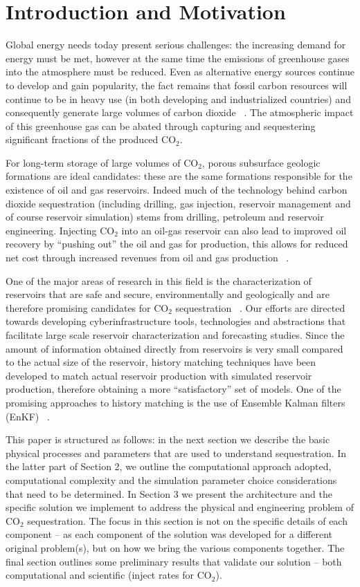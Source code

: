\documentclass{acm_proc_article-sp}
\begin{document}
\section{Introduction and Motivation}

Global energy needs today present serious challenges: the increasing
demand for energy must be met, however at the same time the emissions
of greenhouse gases into the atmosphere must be reduced. Even as
alternative energy sources continue to develop and gain popularity,
the fact remains that fossil carbon resources will continue to be in
heavy use (in both developing and industrialized countries) and
consequently generate large volumes of carbon dioxide
~\cite{GeoRPT}. The atmospheric impact of this greenhouse gas can be
abated through capturing and sequestering significant fractions of the
produced CO$_2$.

For long-term storage of large volumes of CO$_2$, porous subsurface
geologic formations are ideal candidates: these are the same
formations responsible for the existence of oil and gas
reservoirs. Indeed much of the technology behind carbon dioxide
sequestration (including drilling, gas injection, reservoir management
and of course reservoir simulation) stems from drilling, petroleum and
reservoir engineering. Injecting CO$_2$ into an oil-gas reservoir can
also lead to improved oil recovery by ``pushing out'' the oil and gas
for production, this allows for reduced net cost through increased
revenues from oil and gas production ~\cite{EORBook}.

One of the major areas of research in this field is the
characterization of reservoirs that are safe and secure,
environmentally and geologically and are therefore promising
candidates for CO$_2$ sequestration ~\cite{GeoRPT,Luigi}. Our efforts
are directed towards developing cyberinfrastructure tools,
technologies and abstractions that facilitate large scale reservoir
characterization and forecasting studies.  Since the amount of
information obtained directly from reservoirs is very small compared
to the actual size of the reservoir, history matching techniques have
been developed to match actual reservoir production with simulated
reservoir production, therefore obtaining a more ``satisfactory'' set
of models. One of the promising approaches to history matching is the
use of Ensemble Kalman filters (EnKF) ~\cite{KalmanPaper, DO2007,
  LiEnKF07, DO2006}. 

This paper is structured as follows: in the next section we describe the basic
physical processes and parameters that are used to understand
sequestration. In the latter part of Section 2, we outline the
computational approach adopted, computational complexity and the
simulation parameter choice considerations that need to be determined.
In Section 3 we present the architecture and the specific solution we
implement to address the physical and engineering problem of CO$_2$
sequestration. The focus in this section is not on the specific
details of each component -- as each component of the solution was
developed for a different original problem(s), but on how we bring the
various components together.  The final section outlines some
preliminary results that validate our solution -- both computational
and scientific (inject rates for CO$_2$).
\end{document}

